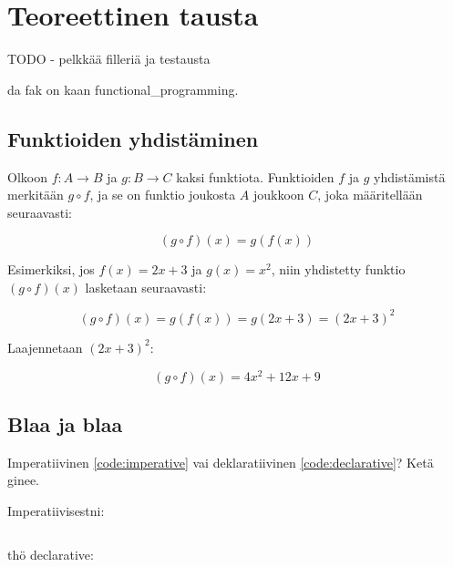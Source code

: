 \vspace{21.5pt} %
\chapter{Teoreettinen tausta}

TODO - pelkkää filleriä ja testausta

da fak on kaan \gls{functional_programming}.

\section{Funktioiden yhdistäminen}

Olkoon \( f: A \rightarrow B \) ja \( g: B \rightarrow C \) kaksi funktiota. Funktioiden \( f \) ja \( g \) yhdistämistä merkitään \( g \circ f \), ja se on funktio joukosta \( A \) joukkoon \( C \), joka määritellään seuraavasti:

\[
  (g \circ f)(x) = g(f(x))
\]

Esimerkiksi, jos \( f(x) = 2x + 3 \) ja \( g(x) = x^2 \), niin yhdistetty funktio \( (g \circ f)(x) \) lasketaan seuraavasti:

\[
  (g \circ f)(x) = g(f(x)) = g(2x + 3) = (2x + 3)^2
\]

Laajennetaan \( (2x + 3)^2 \):

\[
  (g \circ f)(x) = 4x^2 + 12x + 9
\]

\section{Blaa ja blaa}

Imperatiivinen \ref{code:imperative} vai deklaratiivinen \ref{code:declarative}? Ketä ginee.

Imperatiivisestni:

\begin{code}
  \inputminted{javascript}{code/imperative.js}
  \label{code:imperative}
\end{code}

thö declarative:

\begin{code}
  \inputminted{javascript}{code/declarative.js}
  \label{code:declarative}
\end{code}


